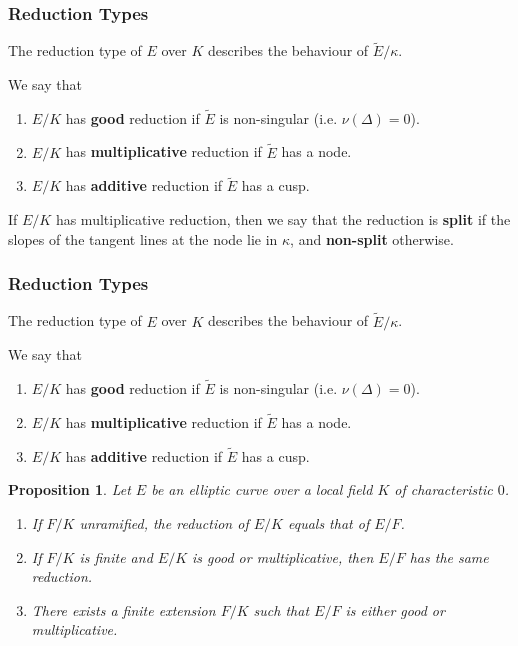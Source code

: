 \documentclass{beamer}
\theoremstyle{plain}
\newtheorem{proposition}[thm]{Proposition}
\begin{document}
\begin{frame}
    \frametitle{Reduction Types}
    The reduction type of $E$ over $K$ describes the behaviour of $\tilde{E}/\kappa$.
    \begin{definition}
        We say that
        \begin{enumerate}%
            \item $E/K$ has \textbf{good} reduction if $\tilde{E}$ is non-singular (i.e. $\nu(\Delta)=0$).
            \item $E/K$ has \textbf{multiplicative} reduction if $\tilde{E}$ has a node.
            \item $E/K$ has \textbf{additive} reduction if $\tilde{E}$ has a cusp.
        \end{enumerate}
        If $E/K$ has multiplicative reduction, then we say that the reduction is \textbf{split} if the slopes of the tangent lines at the node lie in $\kappa$, and \textbf{non-split} otherwise.
    \end{definition}

\end{frame}

\iffalse
\begin{frame}
    \frametitle{Reduction Types}
    The reduction type of $E$ over $K$ describes the behaviour of $\tilde{E}/\kappa$.
    \begin{definition}
        We say that
        \begin{enumerate}%
            \item $E/K$ has \textbf{good} reduction if $\tilde{E}$ is non-singular (i.e. $\nu(\Delta)=0$).
            \item $E/K$ has \textbf{multiplicative} reduction if $\tilde{E}$ has a node.
            \item $E/K$ has \textbf{additive} reduction if $\tilde{E}$ has a cusp.
        \end{enumerate}
    \end{definition}
    \begin{proposition}
        Let $E$ be an elliptic curve over a local field $K$ of characteristic $0$. 
        \begin{enumerate}
            \item If $F/K$ unramified, the reduction of $E/K$ equals that of $E/F$.
            \item If $F/K$ is finite and $E/K$ is good or multiplicative, then $E/F$ has the same reduction.
            \item There exists a finite extension $F/K$ such that $E/F$ is either good or multiplicative.
        \end{enumerate}
    \end{proposition}
\end{frame}
\end{document}
